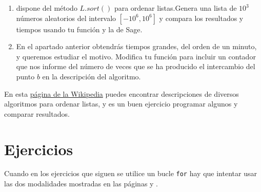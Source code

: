 \begin{enumerate}
\begin{ejer}
\begin{enumerate}
    \item  {\sage} dispone del método $L.sort()$ para ordenar listas.Genera una lista de $10^3$ números aleatorios del intervalo $[-10^6,10^6]$ y
    compara  los resultados y tiempos usando tu función y la de Sage. 
    \item En el apartado anterior obtendrás tiempos grandes, del orden de un minuto, y queremos estudiar el motivo. Modifica tu función para incluir un contador que nos informe del número de veces que se ha producido el intercambio del punto $b$ en la descripción del algoritmo.

\end{enumerate}
\end{ejer}
\end{enumerate} 


En esta \href{https://en.wikipedia.org/wiki/Sorting_algorithm}{p\'agina de la
Wikipedia} puedes encontrar descripciones de diversos algoritmos para ordenar
listas, y {\sc es un buen ejercicio programar} algunos y comparar resultados.






\section{Ejercicios}\label{ej-program}





Cuando en los ejercicios que siguen se utilice un bucle \lstinline|for| hay que
intentar usar las dos modalidades mostradas en las páginas
\pageref{for-sintaxis1} y \pageref{for-sintaxis2}.


